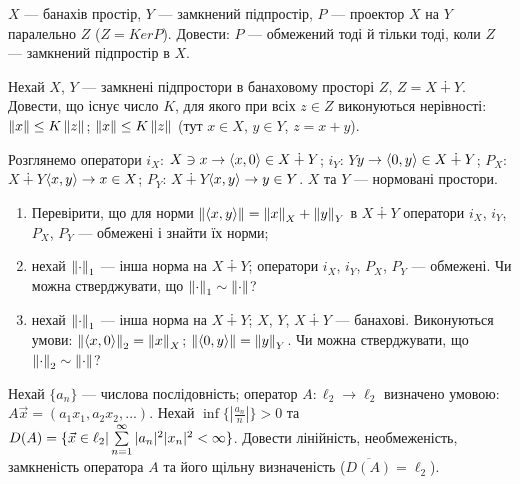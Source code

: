 
\begin{exercise}
    $X$ --- банахів простір, $Y$ --- замкнений підпростір, 
    $P$ --- проектор $X$ на $Y$ паралельно $Z$ ($Z = Ker P$). 
    Довести: $P$ --- обмежений тоді й тільки тоді, коли $Z$ --- 
    замкнений підпростір в $X$.
\end{exercise}

\begin{exercise}
    Нехай $X$, $Y$ --- замкнені підпростори в банаховому просторі $Z$, 
    $Z = X \dotplus Y$. Довести, що існує число $K$, для якого при всіх $z \in Z$ 
    виконуються нерівності: $\left\lVert x\right\rVert \leq K\left\lVert z\right\rVert$; $\left\lVert x\right\rVert \leq K\left\lVert z\right\rVert$ (тут 
    $x \in X$, $y \in Y$, $z = x + y$). 
\end{exercise}

\begin{exercise}
    Розглянемо оператори $i_X$: $X \ni x \rightarrow 
    \left<x, 0\right> \in X \dotplus Y$;
    $i_Y$: $Y $$ y \rightarrow 
    \left<0, y\right> \in X \dotplus Y$;
    $P_X$: $X \dotplus Y $$ \left<x, y\right> \rightarrow 
    x \in X $;
    $P_Y$: $X \dotplus Y $$ \left<x, y\right> \rightarrow 
    y \in Y $. $X$ та $Y$ --- нормовані простори.
    \begin{enumerate}
        \item Перевірити, що для норми $\left\lVert\left<x, y\right>\right\rVert = 
        \left\lVert x\right\rVert_X + \left\lVert y\right\rVert_Y$ в $X \dotplus Y$ оператори $i_X$, $i_Y$, 
        $P_X$, $P_Y$ --- обмежені і знайти їх норми;
        \item нехай $\left\lVert\cdot\right\rVert_1$ --- інша норма на $X \dotplus Y$; 
        оператори $i_X$, $i_Y$, $P_X$, $P_Y$ --- обмежені. Чи можна 
        стверджувати, що $\left\lVert\cdot\right\rVert_1 \sim \left\lVert\cdot\right\rVert$?
        \item нехай $\left\lVert\cdot\right\rVert_1$ --- інша норма на $X \dotplus Y$;
        $X$, $Y$, $X \dotplus Y$ --- банахові. Виконуються умови: 
        $\left\lVert\left<x, 0\right>\right\rVert_2 = \left\lVert x\right\rVert_X$; $\left\lVert\left<0, y\right>\right\rVert 
        = \left\lVert y\right\rVert_Y$. Чи можна 
        стверджувати, що $\left\lVert\cdot\right\rVert_2 \sim \left\lVert\cdot\right\rVert$?
    \end{enumerate}
\end{exercise}

\begin{exercise}\label{N:2_1_18}
    Нехай $\{a_n\}$ --- числова послідовність; оператор $A: \ell_2 
    \rightarrow \ell_2$ визначено умовою: $A\vec{x} = 
    (a_1x_1, a_2x_2, ...)$. Нехай $\inf\{|\frac{a_n}{n}|\} > 0$ та 
    $D(A) = \{\vec{x} \in \ell_2 | \sum\limits_{n=1}^{\infty}|a_n|^2|x_n|^2 
    < \infty\}$. Довести лінійність, необмеженість, замкненість оператора 
    $A$ та його щільну визначеність ($\overline{D(A)} = \ell_2$).
\end{exercise}


